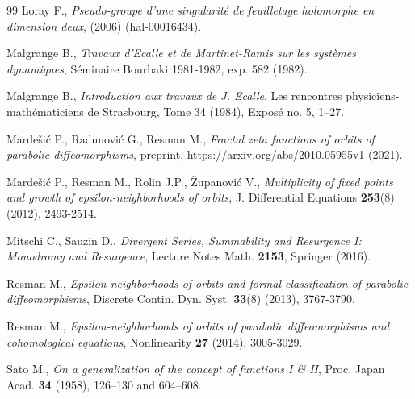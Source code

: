 \documentclass[a4paper,11pt]{amsart}
\numberwithin{equation}{section}
\theoremstyle{definition}
\begin{document}
\begin{thebibliography}{99}
	 Loray F., \emph{Pseudo-groupe d'une singularité de feuilletage holomorphe en dimension deux}, (2006) (hal-00016434).
	
	 Malgrange B., \emph{Travaux d'Ecalle et de Martinet-Ramis sur les syst\`{e}mes dynamiques}, S\'{e}minaire Bourbaki 1981-1982, exp. 582 (1982).
	
	 Malgrange B., \emph{Introduction aux travaux de J. Ecalle}, Les rencontres physiciens-mathématiciens de Strasbourg, Tome 34 (1984), Exposé no. 5, 1--27.  	%
	
	 Marde\v{s}i\'c P., Radunovi\'c G., Resman M., \emph{Fractal zeta functions of orbits of parabolic diffeomorphisms}, preprint, https://arxiv.org/abs/2010.05955v1   (2021).
	
	 Marde\v{s}i\'c P., Resman M., Rolin J.P., \v{Z}upanovi\'c V., \emph{Multiplicity of fixed points and growth of epsilon-neighborhoods of orbits}, J. Differential Equations \textbf{253}(8) (2012), 2493-2514.
	
	
	
	 Mitschi C., Sauzin D., \emph{Divergent Series, Summability and Resurgence I: Monodromy and 	Resurgence}, Lecture Notes Math. \textbf{2153}, Springer  (2016). 

	 Resman M., \emph{Epsilon-neighborhoods of orbits and formal classification of parabolic diffeomorphisms}, Discrete Contin. Dyn. Syst. \textbf{33}(8) (2013), 3767-3790.
	
	 Resman M., \emph{Epsilon-neighborhoods of orbits of parabolic diffeomorphisms and cohomological equations}, Nonlinearity \textbf{27} (2014), 3005-3029.
	
	 Sato M., \emph{On a generalization of the concept of functions  I \& II}, Proc. Japan Acad. \textbf{34} (1958), 126–130 and 604–608.
	

\end{thebibliography}
\end{document}

